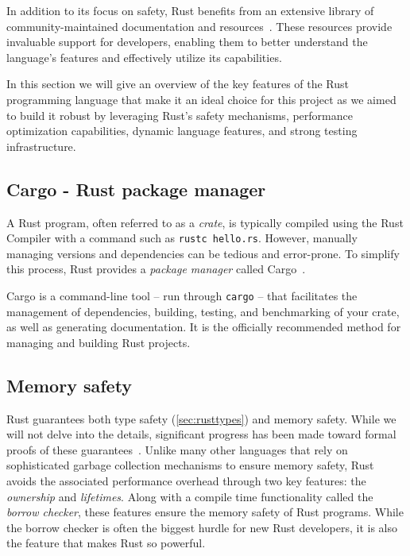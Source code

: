 \documentclass[11pt]{report}
\theoremstyle{definition}
\theoremstyle{plain}
\begin{document}
In addition to its focus on safety, Rust benefits from an extensive library of community-maintained documentation and resources~\cite{rustlangRustProgramming,rustlangPerformanceBook,lurklurkEffectiveRust}. These resources provide invaluable support for developers, enabling them to better understand the language's features and effectively utilize its capabilities.

In this section we will give an overview of the key features of the Rust programming language that make it an ideal choice for this project as we aimed to build it robust by leveraging Rust's safety mechanisms, performance optimization capabilities, dynamic language features, and strong testing infrastructure.

\subsection{Cargo - Rust package manager}\label{sec:cargo}
A Rust program, often referred to as a \textit{crate}, is typically compiled using the Rust Compiler with a command such as \texttt{rustc hello.rs}. However, manually managing versions and dependencies can be tedious and error-prone. To simplify this process, Rust provides a \textit{package manager} called Cargo~\cite{rustlangCargo}.

Cargo is a command-line tool -- run through \texttt{cargo} -- that facilitates the management of dependencies, building, testing, and benchmarking of your crate, as well as generating documentation. It is the officially recommended method for managing and building Rust projects.


\subsection{Memory safety}\label{sec:rustborrow} %
Rust guarantees both type safety (\autoref{sec:rusttypes}) and memory safety. While we will not delve into the details, significant progress has been made toward formal proofs of these guarantees~\cite{jung2017rustbelt}. Unlike many other languages that rely on sophisticated garbage collection mechanisms to ensure memory safety, Rust avoids the associated performance overhead through two key features: the \textit{ownership} and \textit{lifetimes}. Along with a compile time functionality called the \textit{borrow checker}, these features ensure the memory safety of Rust programs. While the borrow checker is often the biggest hurdle for new Rust developers, it is also the feature that makes Rust so powerful.
\end{document}
